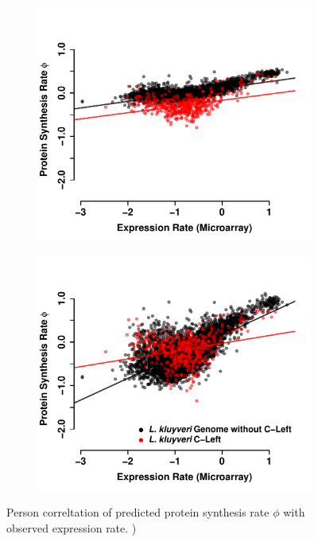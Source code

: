 \documentclass[letter,12pt]{article}
\begin{document}
\begin{figure}[H]
    \centering
    \begin{subfigure}
        \centering
        \includegraphics[width=.45\textwidth]{img/phi_corr_plot_whole_Genome_estim.pdf}
    \end{subfigure}
    \begin{subfigure}
        \centering
        \includegraphics[width=.45\textwidth]{img/phi_corr_plot_split_Genome_estim.pdf}
    \end{subfigure}
    \caption{Person correltation of predicted protein synthesis rate $\phi$ with observed expression rate. )}
    \label{fig:phi_corr_two_cond}
\end{figure}
\end{document}
